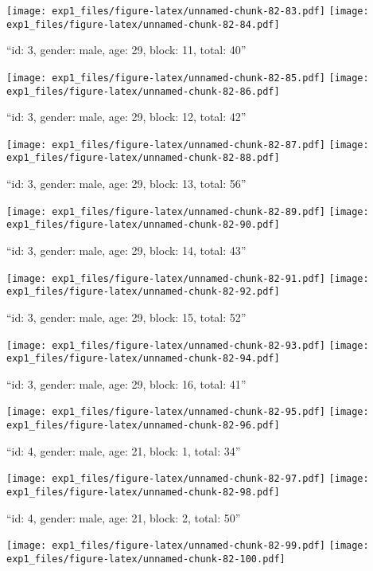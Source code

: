 \documentclass[11pt,,]{article}
\begin{document}
\texttt{[image: exp1\_files/figure-latex/unnamed-chunk-82-83.pdf]}
\texttt{[image: exp1\_files/figure-latex/unnamed-chunk-82-84.pdf]}

\newpage
[1] 

``id: 3, gender: male, age: 29, block: 11, total: 40''

\texttt{[image: exp1\_files/figure-latex/unnamed-chunk-82-85.pdf]}
\texttt{[image: exp1\_files/figure-latex/unnamed-chunk-82-86.pdf]}

\newpage
[1] 

``id: 3, gender: male, age: 29, block: 12, total: 42''

\texttt{[image: exp1\_files/figure-latex/unnamed-chunk-82-87.pdf]}
\texttt{[image: exp1\_files/figure-latex/unnamed-chunk-82-88.pdf]}

\newpage
[1] 

``id: 3, gender: male, age: 29, block: 13, total: 56''

\texttt{[image: exp1\_files/figure-latex/unnamed-chunk-82-89.pdf]}
\texttt{[image: exp1\_files/figure-latex/unnamed-chunk-82-90.pdf]}

\newpage
[1] 

``id: 3, gender: male, age: 29, block: 14, total: 43''

\texttt{[image: exp1\_files/figure-latex/unnamed-chunk-82-91.pdf]}
\texttt{[image: exp1\_files/figure-latex/unnamed-chunk-82-92.pdf]}

\newpage
[1] 

``id: 3, gender: male, age: 29, block: 15, total: 52''

\texttt{[image: exp1\_files/figure-latex/unnamed-chunk-82-93.pdf]}
\texttt{[image: exp1\_files/figure-latex/unnamed-chunk-82-94.pdf]}

\newpage
[1] 

``id: 3, gender: male, age: 29, block: 16, total: 41''

\texttt{[image: exp1\_files/figure-latex/unnamed-chunk-82-95.pdf]}
\texttt{[image: exp1\_files/figure-latex/unnamed-chunk-82-96.pdf]}

\newpage
[1] 

``id: 4, gender: male, age: 21, block: 1, total: 34''

\texttt{[image: exp1\_files/figure-latex/unnamed-chunk-82-97.pdf]}
\texttt{[image: exp1\_files/figure-latex/unnamed-chunk-82-98.pdf]}

\newpage
[1] 

``id: 4, gender: male, age: 21, block: 2, total: 50''

\texttt{[image: exp1\_files/figure-latex/unnamed-chunk-82-99.pdf]}
\texttt{[image: exp1\_files/figure-latex/unnamed-chunk-82-100.pdf]}
\end{document}
